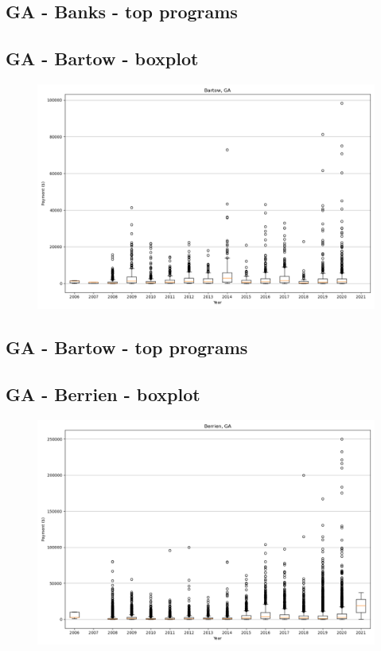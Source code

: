 \subsection*{GA - Banks - top programs}

\newpage
\subsection*{GA - Bartow - boxplot}
\begin{figure}[h]
\centering
\includegraphics[width=7in]{../output/boxplots/counties/Bartow-GA_boxplot.png}
\end{figure}


\subsection*{GA - Bartow - top programs}

\newpage
\subsection*{GA - Berrien - boxplot}
\begin{figure}[h]
\centering
\includegraphics[width=7in]{../output/boxplots/counties/Berrien-GA_boxplot.png}
\end{figure}


